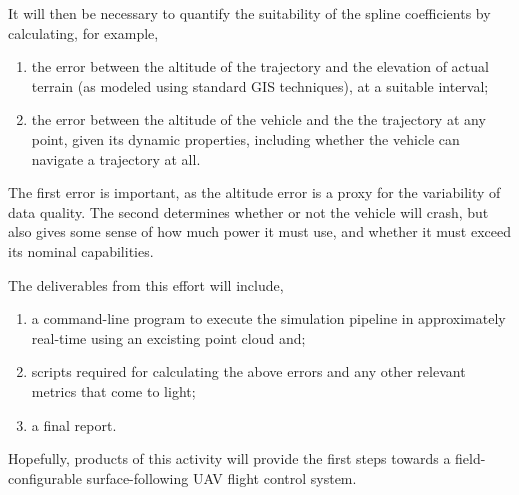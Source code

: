 \documentclass[doc]{apa6}
\begin{document}
It will then be necessary to quantify the suitability of the spline coefficients by calculating, for example,

\begin{enumerate}
\item the error between the altitude of the trajectory and the elevation of actual terrain (as modeled using standard GIS techniques), at a suitable interval;
\item the error between the altitude of the vehicle and the the trajectory at any point, given its dynamic properties, including whether the vehicle can navigate a trajectory at all.
\end{enumerate}

The first error is important, as the altitude error is a proxy for the variability of data quality. The second determines whether or not the vehicle will crash, but also gives some sense of how much power it must use, and whether it must exceed its nominal capabilities.

The deliverables from this effort will include,

\begin{enumerate}
\item a command-line program to execute the simulation pipeline in approximately real-time using an excisting point cloud and;
\item scripts required for calculating the above errors and any other relevant metrics that come to light;
\item a final report.
\end{enumerate}

Hopefully, products of this activity will provide the first steps towards a field-configurable surface-following UAV flight control system.

\newpage

\printbibliography
\end{document}
